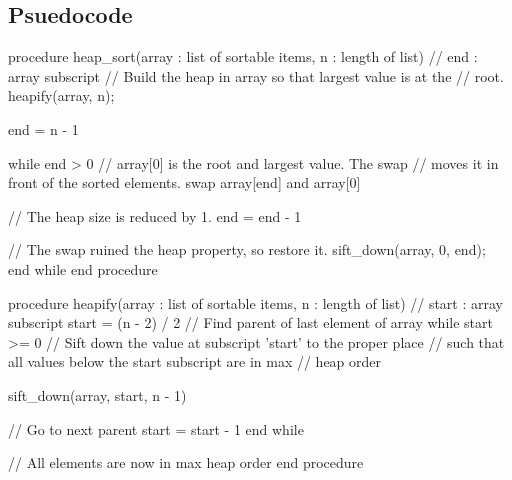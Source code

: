 \documentclass{report}
\begin{document}
    \pagebreak 
    \subsection{Psuedocode}
    \bigbreak \noindent 
    \begin{cppcode}
procedure heap_sort(array : list of sortable items, n : length of list)
    // end : array subscript
    // Build the heap in array so that largest value is at the
    // root.
    heapify(array, n);

    end = n - 1

    while end > 0
        // array[0] is the root and largest value. The swap
        // moves it in front of the sorted elements.
        swap array[end] and array[0]

        // The heap size is reduced by 1.
        end = end - 1

        // The swap ruined the heap property, so restore it.
        sift_down(array, 0, end);
    end while
end procedure

procedure heapify(array : list of sortable items, n : length of list)
    // start : array subscript
    start = (n - 2) / 2 // Find parent of last element of array
    while start >= 0
        // Sift down the value at subscript 'start' to the proper place
        // such that all values below the start subscript are in max
        // heap order

        sift_down(array, start, n - 1)

        // Go to next parent
        start = start - 1
    end while

    // All elements are now in max heap order
end procedure
    \end{cppcode}
\end{document}
